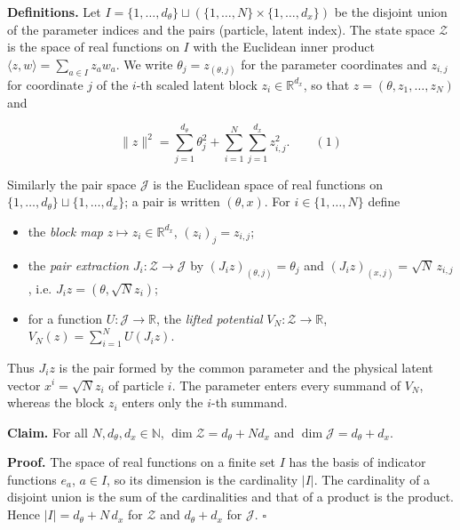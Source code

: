 \documentclass[11pt,a4paper]{article}
\begin{document}
\textbf{Definitions.} Let \(I=\{1,\dots,d_\theta\}\sqcup(\{1,\dots,N\}\times\{1,\dots,d_x\})\) be the disjoint union of the parameter indices and the pairs (particle, latent index). The state space \(\mathcal Z\) is the space of real functions on \(I\) with the Euclidean inner product \(\langle z,w\rangle=\sum_{a\in I}z_aw_a\). We write \(\theta_j=z_{(\theta,j)}\) for the parameter coordinates and \(z_{i,j}\) for coordinate \(j\) of the \(i\)-th scaled latent block \(z_i\in\mathbb R^{d_x}\), so that \(z=(\theta,z_1,\dots,z_N)\) and


\[\|z\|^2=\sum_{j=1}^{d_\theta}\theta_j^2+\sum_{i=1}^N\sum_{j=1}^{d_x}z_{i,j}^2 .\qquad(1)\]


Similarly the pair space \(\mathcal J\) is the Euclidean space of real functions on \(\{1,\dots,d_\theta\}\sqcup\{1,\dots,d_x\}\); a pair is written \((\theta,x)\). For \(i\in\{1,\dots,N\}\) define



\begin{itemize}


\item the \emph{block map} \(z\mapsto z_i\in\mathbb R^{d_x}\), \((z_i)_j=z_{i,j}\);

\item the \emph{pair extraction} \(J_i:\mathcal Z\to\mathcal J\) by \((J_iz)_{(\theta,j)}=\theta_j\) and \((J_iz)_{(x,j)}=\sqrt N\,z_{i,j}\), i.e. \(J_iz=(\theta,\sqrt Nz_i)\);

\item for a function \(U:\mathcal J\to\mathbb R\), the \emph{lifted potential} \(V_N:\mathcal Z\to\mathbb R\), \(V_N(z)=\sum_{i=1}^NU(J_iz)\).

\end{itemize}



Thus \(J_iz\) is the pair formed by the common parameter and the physical latent vector \(x^i=\sqrt Nz_i\) of particle \(i\). The parameter enters every summand of \(V_N\), whereas the block \(z_i\) enters only the \(i\)-th summand.




\textbf{Claim.} For all \(N,d_\theta,d_x\in\mathbb N\), \(\dim\mathcal Z=d_\theta+Nd_x\) and \(\dim\mathcal J=d_\theta+d_x\).




\textbf{Proof.} The space of real functions on a finite set \(I\) has the basis of indicator functions \(e_a\), \(a\in I\), so its dimension is the cardinality \(|I|\). The cardinality of a disjoint union is the sum of the cardinalities and that of a product is the product. Hence \(|I|=d_\theta+N\,d_x\) for \(\mathcal Z\) and \(d_\theta+d_x\) for \(\mathcal J\). \(\square\)
\end{document}
